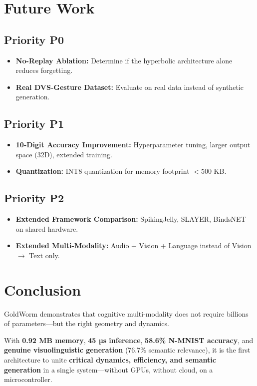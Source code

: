 \documentclass[conference]{IEEEtran}
\begin{document}
\section{Future Work}

\subsection{Priority P0}
\begin{itemize}
    \item \textbf{No-Replay Ablation:} Determine if the hyperbolic architecture alone reduces forgetting.
    \item \textbf{Real DVS-Gesture Dataset:} Evaluate on real data instead of synthetic generation.
\end{itemize}

\subsection{Priority P1}
\begin{itemize}
    \item \textbf{10-Digit Accuracy Improvement:} Hyperparameter tuning, larger output space (32D), extended training.
    \item \textbf{Quantization:} INT8 quantization for memory footprint $<$500 KB.
\end{itemize}

\subsection{Priority P2}
\begin{itemize}
    \item \textbf{Extended Framework Comparison:} SpikingJelly, SLAYER, BindsNET on shared hardware.
    \item \textbf{Extended Multi-Modality:} Audio + Vision + Language instead of Vision $\rightarrow$ Text only.
\end{itemize}

\section{Conclusion}

GoldWorm demonstrates that cognitive multi-modality does not require billions of parameters---but the right geometry and dynamics.

With \textbf{0.92 MB memory}, \textbf{45 µs inference}, \textbf{58.6\% N-MNIST accuracy}, and \textbf{genuine visuolinguistic generation} (76.7\% semantic relevance), it is the first architecture to unite \textbf{critical dynamics, efficiency, and semantic generation} in a single system---without GPUs, without cloud, on a microcontroller.
\end{document}
